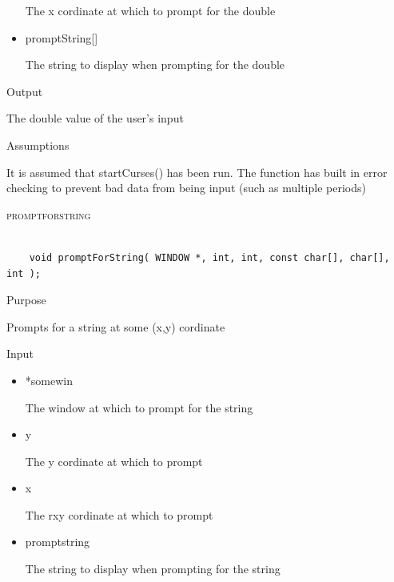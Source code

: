 \documentclass[pdftex, 11pt]{article}
\begin{document}
\begin{description}
\begin{description}
\begin{itemize}
						The x cordinate at which to prompt
						for the double

					\item{promptString[]}

						The string to display when prompting for
						the double
						
				\end{itemize}



			\item{Output}

				The double value of the user's input

			\item{Assumptions}

				It is assumed that startCurses() has been run.
				The function has built in error checking to prevent
				bad data from being input (such as multiple periods)

		\end{description}


	\item{\textsc{promptforstring}}

		\begin{lstlisting}

	void promptForString( WINDOW *, int, int, const char[], char[], int );
		\end{lstlisting}

		\begin{description}
			\item{Purpose}

				Prompts for a string at some (x,y) cordinate

			\item{Input}

				\begin{itemize}

					\item{*somewin}

						The window at which to prompt
						for the string

					\item{y}

						The y cordinate at which to prompt

					\item{x}

						The rxy cordinate at which to prompt

					\item{promptstring}

						The string to display when prompting
						for the string


\end{itemize}
\end{description}
\end{description}
\end{document}
